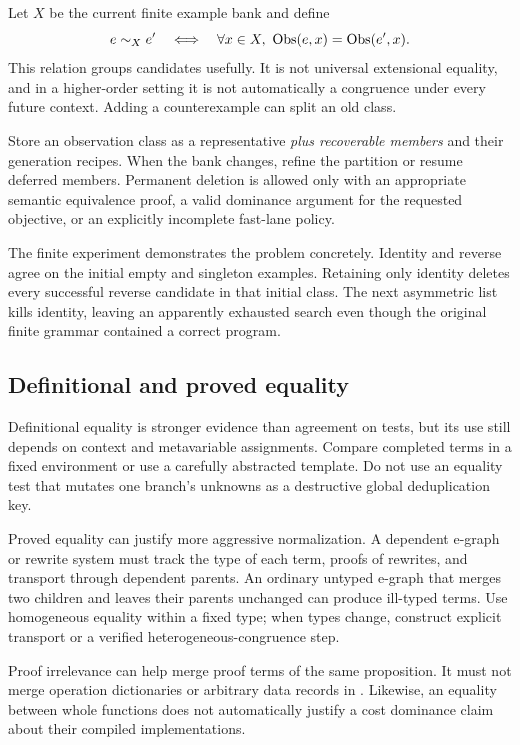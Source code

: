 Let $X$ be the current finite example bank and define
\[
 e\sim_X e'\quad\Longleftrightarrow\quad
 \forall x\in X,\ \operatorname{Obs}(e,x)=\operatorname{Obs}(e',x).
\]
This relation groups candidates usefully. It is not universal extensional
equality, and in a higher-order setting it is not automatically a congruence
under every future context. Adding a counterexample can split an old class.

Store an observation class as a representative \emph{plus recoverable members}
and their generation recipes. When the bank changes, refine the partition or
resume deferred members. Permanent deletion is allowed only with an appropriate
semantic equivalence proof, a valid dominance argument for the requested
objective, or an explicitly incomplete fast-lane policy.

The finite experiment demonstrates the problem concretely. Identity and
reverse agree on the initial empty and singleton examples. Retaining only
identity deletes every successful reverse candidate in that initial class.
The next asymmetric list kills identity, leaving an apparently exhausted
search even though the original finite grammar contained a correct program.

\subsection{Definitional and proved equality}

Definitional equality is stronger evidence than agreement on tests, but its
use still depends on context and metavariable assignments. Compare completed
terms in a fixed environment or use a carefully abstracted template. Do not
use an equality test that mutates one branch's unknowns as a destructive global
deduplication key.

Proved equality can justify more aggressive normalization. A dependent e-graph
or rewrite system must track the type of each term, proofs of rewrites, and
transport through dependent parents. An ordinary untyped e-graph that merges
two children and leaves their parents unchanged can produce ill-typed terms.
Use homogeneous equality within a fixed type; when types change, construct
explicit transport or a verified heterogeneous-congruence step.

Proof irrelevance can help merge proof terms of the same proposition. It must
not merge operation dictionaries or arbitrary data records in .
Likewise, an equality between whole functions does not automatically justify a
cost dominance claim about their compiled implementations.

